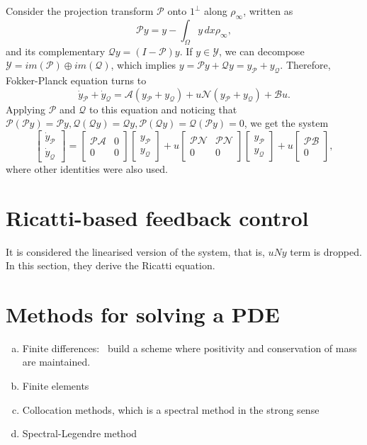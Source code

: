 \documentclass[12pt]{article}
\newcommand{\N}{\mathcal{N}}
\newcommand{\A}{\mathcal{A}}
\newcommand{\B}{\mathcal{B}}
\renewcommand{\P}{\mathcal{P}}
\newcommand{\Q}{\mathcal{Q}}
\newcommand{\steady}{\rho_{\infty}}
\theoremstyle{definition}
\begin{document}
Consider the projection transform $\mathcal{P}$ onto $1^{\perp}$ along $\steady$, written as 
\[
\mathcal{P}y = y - \int_{\Omega} y \, dx \steady,    
\]
and its complementary $\mathcal{Q}y = (I-\mathcal{P})y$.
If $y \in \mathcal{Y}$, we can decompose $\mathcal{Y} = im(\mathcal{P}) \oplus im(\mathcal{Q})$, which implies $y = \mathcal{P}y + \mathcal{Q}y = y_{\mathcal{P}} + y_{\mathcal{Q}}$.
Therefore, Fokker-Planck equation turns to
\[
\dot{y}_{\P} + \dot{y}_{\Q} = \mathcal{A}(y_{\P} + y_{\Q}) + u\N(y_{\P} + y_{\Q}) + \B u.
\]
Applying $\P$ and $\Q$ to this equation and noticing that $\P(\P y) = \P y, \Q(\Q y) = \Q y, \P(\Q y) = \Q(\P y) = 0$, we get the system
\[
\begin{bmatrix}
    \dot{y}_{\P} \\ \dot{y}_{\Q} 
\end{bmatrix} = \begin{bmatrix}
    \P\A & 0 \\ 0 & 0 
\end{bmatrix}\begin{bmatrix}
    y_{\P} \\ y_{\Q} 
\end{bmatrix} + u\begin{bmatrix}
    \P\N & \P\N \\ 0 & 0 
\end{bmatrix}\begin{bmatrix}
    y_{\P} \\ y_{\Q} 
\end{bmatrix} + u\begin{bmatrix}
    \P\B \\ 0
\end{bmatrix},
\]
where other identities were also used.

\section{Ricatti-based feedback control}

It is considered the linearised version of the system, that is, $uNy$ term is dropped.
In this section, they derive the Ricatti equation.

\section{Methods for solving a PDE}

\begin{enumerate}[(a)]
    \item Finite differences:~\cite{chang1970practical} build a scheme where positivity and conservation of mass are maintained.
    \item Finite elements
    \item Collocation methods, which is a spectral method in the strong sense
    \item Spectral-Legendre method
\end{enumerate}
\end{document}
